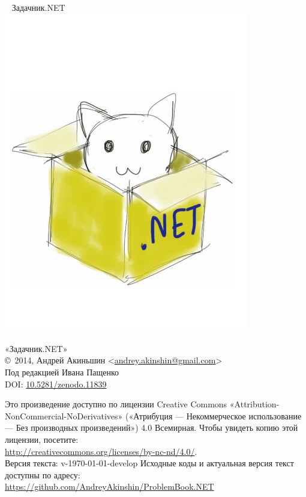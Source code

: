 \begin{center}
~\vspace{4cm}\newline
{\Huge{Задачник.NET}}
\includegraphics[width=0.8\textwidth]{cover}
\end{center}
\newpage

\hbox{}
\vfill
{
\noindent
«Задачник.NET»\\
\copyright\ 2014, Андрей Акиньшин <\href{mailto:andrey.akinshin@gmail.com}{andrey.akinshin@gmail.com}>\\
Под редакцией Ивана Пащенко\\
DOI: \href{http://dx.doi.org/10.5281/zenodo.11839}{10.5281/zenodo.11839}

\medskip
\noindent
Это произведение доступно по лицензии Creative Commons «Attribution-NonCommercial-NoDerivatives» («Атрибуция — Некоммерческое использование — Без производных произведений») 4.0 Всемирная. Чтобы увидеть копию этой лицензии, посетите:\\ \url{http://creativecommons.org/licenses/by-nc-nd/4.0/}.\\
Версия текста: v-\versiondate\today-develop \newline
Исходные коды и актуальная версия текст доступны по адресу:\\ \url{https://github.com/AndreyAkinshin/ProblemBook.NET}
}
\newpage